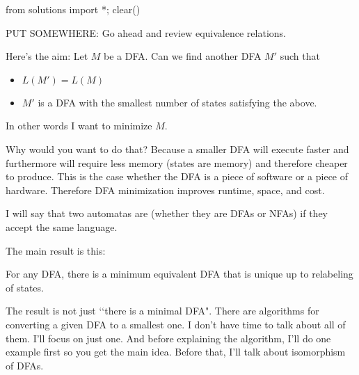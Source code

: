 \begin{python0}
  from solutions import *; clear()
\end{python0}


PUT SOMEWHERE: Go ahead and review equivalence relations.

Here's the aim: Let $M$ be a DFA. Can we find another DFA $M'$ such
that
\begin{itemize}
\item $L(M') = L(M)$
\item $M'$ is a DFA with the smallest number of states satisfying
  the above.
\end{itemize}
In other words I want to minimize $M$.

Why would you want to do that?
Because a smaller DFA will execute faster and
furthermore will require less memory (states are memory)
and therefore cheaper to produce.
This is the case whether the DFA is a piece of software
or a piece of hardware.
Therefore DFA minimization improves runtime, space,
and cost.

I will say that two automatas are  (whether they
are DFAs or NFAs) if they
accept the same language.



The main result is this:

\begin{thm}
  For any DFA, there is a minimum equivalent DFA that is unique
  up to relabeling of states.
\end{thm}

The result is not just \lq\lq there is a minimal DFA".
There are algorithms for converting a given DFA to a smallest one.
I don't have time to talk about all of them.
I'll focus on just one.
And before explaining the algorithm, I'll do one example
first so you get the main idea.
Before that, I'll talk about isomorphism of DFAs.

